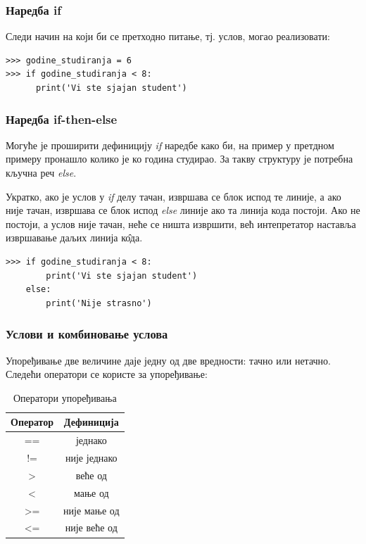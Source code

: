 \subsubsection{Наредба if}

Следи начин на који би се претходно питање, тј. услов, могао реализовати:

\begin{lstlisting}[caption = Пример услова, label = if]
>>> godine_studiranja = 6
>>> if godine_studiranja < 8:
      print('Vi ste sjajan student')
\end{lstlisting}
\subsubsection{Наредба if-then-else}

Могуће је проширити дефиницију \emph{if} наредбе како би, на пример у претдном примеру пронашло колико је ко година студирао. За такву структуру је потребна кључна реч \emph{else}.

Укратко, ако је услов у \emph{if} делу тачан, извршава се блок испод те линије, а ако није тачан, извршава се блок испод \emph{else} линије ако та линија кода постоји. Ако не постоји, а услов није тачан, неће се ништа извршити, већ интепретатор наставља извршавање даљих линија к\^{о}да.

\begin{lstlisting}[caption = Пример за наредбе IF - ELSE, label = ifelse]
>>> if godine_studiranja < 8:
        print('Vi ste sjajan student')
    else:
        print('Nije strasno')
\end{lstlisting}

\subsubsection{Услови и комбиновање услова}

Упоређивање две величине даје једну од две вредности: тачно или нетачно. Следећи оператори се користе за упоређивање:

\begin{table}[here]
\centering
\begin{tabular}{|c|c|} \hline
\textbf{Оператор} & \textbf{Дефиниција} \\ \hline \hline
== & једнако \\ \hline
!= & није једнако \\ \hline
> & веће од  \\ \hline
< & мање од \\ \hline
>= & није мање од \\ \hline
<= & није веће од \\ \hline
\end{tabular}\medskip
\caption{Оператори упоређивања}
\label{tabele:opporedjenja}
\end{table}

